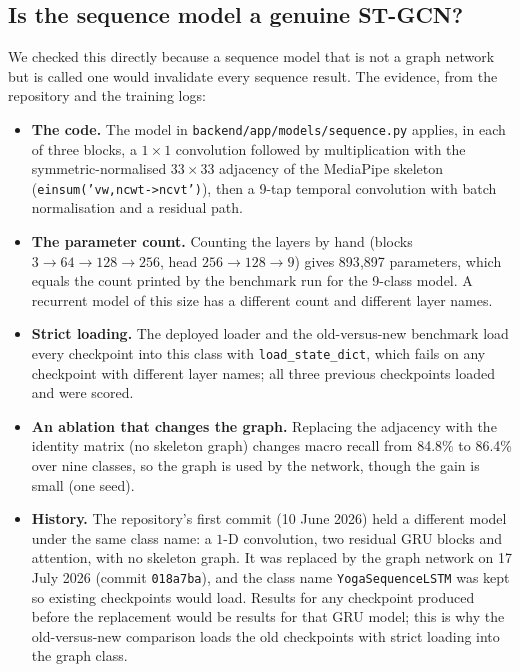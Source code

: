 \subsection{Is the sequence model a genuine ST-GCN?}\label{sec:genuine}
We checked this directly because a sequence model that is not a graph network but is called one would invalidate every sequence result. The evidence, from the repository and the training logs:
\begin{itemize}
\item \textbf{The code.} The model in \texttt{backend/app/models/sequence.py} applies, in each of three blocks, a $1{\times}1$ convolution followed by multiplication with the symmetric-normalised $33{\times}33$ adjacency of the MediaPipe skeleton (\texttt{einsum('vw,ncwt->ncvt')}), then a 9-tap temporal convolution with batch normalisation and a residual path.
\item \textbf{The parameter count.} Counting the layers by hand (blocks $3{\to}64{\to}128{\to}256$, head $256{\to}128{\to}9$) gives 893{,}897 parameters, which equals the count printed by the benchmark run for the 9-class model. A recurrent model of this size has a different count and different layer names.
\item \textbf{Strict loading.} The deployed loader and the old-versus-new benchmark load every checkpoint into this class with \texttt{load\_state\_dict}, which fails on any checkpoint with different layer names; all three previous checkpoints loaded and were scored.
\item \textbf{An ablation that changes the graph.} Replacing the adjacency with the identity matrix (no skeleton graph) changes macro recall from 84.8\% to 86.4\% over nine classes, so the graph is used by the network, though the gain is small (one seed).
\item \textbf{History.} The repository's first commit (10 June 2026) held a different model under the same class name: a $1$-D convolution, two residual GRU blocks and attention, with no skeleton graph. It was replaced by the graph network on 17 July 2026 (commit \texttt{018a7ba}), and the class name \texttt{YogaSequenceLSTM} was kept so existing checkpoints would load. Results for any checkpoint produced before the replacement would be results for that GRU model; this is why the old-versus-new comparison loads the old checkpoints with strict loading into the graph class.
\end{itemize}
